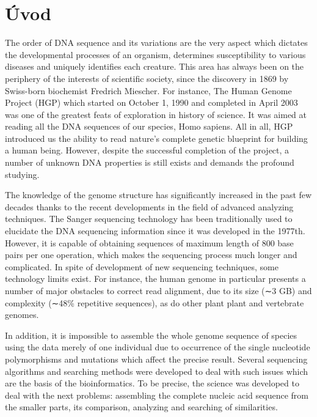 
{}

\chapter*{Úvod}

\par The order of DNA sequence and its variations are the very aspect which dictates the developmental processes of an organism, determines susceptibility to various diseases and uniquely identifies each creature. This area has always been on the periphery of the interests of scientific society, since the discovery in 1869 by Swiss-born biochemist Fredrich Miescher. For instance, The Human Genome Project (HGP) which started on October 1, 1990 and completed in April 2003 was one of the greatest feats of exploration in history of science. It was aimed at reading all the DNA sequences of our species, Homo sapiens. All in all, HGP introduced us the ability to read nature's complete genetic blueprint for building a human being. However, despite the successful completion of the project, a number of unknown DNA properties is still exists and demands the profound studying.

The knowledge of the genome structure has significantly increased in the past few decades thanks to the recent developments in the field of advanced analyzing techniques. The Sanger sequencing technology has been traditionally used to elucidate the DNA sequencing information since it was developed in the 1977th. However, it is capable of obtaining sequences of maximum length of 800 base pairs per one operation, which makes the sequencing process much longer and complicated. In spite of development of new sequencing techniques, some technology limits exist. For instance, the human genome in particular presents a number of major obstacles to correct read alignment, due to its size (∼3 GB) and complexity (∼48\% repetitive sequences), as do other plant plant and vertebrate genomes.

In addition, it is impossible to assemble the whole genome sequence of species using the data merely of one individual due to occurrence of the single nucleotide polymorphisms and mutations which affect the precise result. Several sequencing algorithms and searching methods were developed to deal with such issues which are the basis of the bioinformatics. To be precise, the science was developed to deal with the next problems: assembling the complete nucleic acid sequence from the smaller parts, its comparison, analyzing and searching of similarities.

